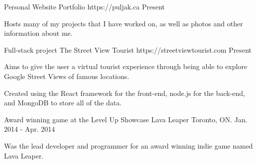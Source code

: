 

\begin{cventries}

  \cventry
    {Personal Website} %
    {Portfolio} %
    {https://puljak.ca} %
    {Present} %
    {
      \begin{cvitems} %
        \item {Hosts many of my projects that I have worked on, as well as photos and other information about me.}
      \end{cvitems}
    }

  \cventry
    {Full-stack project} %
    {The Street View Tourist} %
    {https://streetviewtourist.com} %
    {Present} %
    {
      \begin{cvitems} %
        \item {Aims to give the user a virtual tourist experience through being able to explore Google Street Views of famous locations.}
        \item {Created using the React framework for the front-end, node.js for the back-end, and MongoDB to store all of the data.}
      \end{cvitems}
    }

  \cventry
    {Award winning game at the Level Up Showcase} %
    {Lava Leaper} %
    {Toronto, ON.} %
    {Jan. 2014 - Apr. 2014} %
    {
      \begin{cvitems} %
        \item {Was the lead developer and programmer for an award winning indie game named Lava Leaper.}
      \end{cvitems}
    }

\end{cventries}
